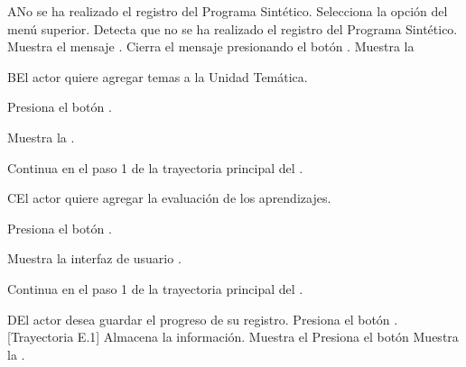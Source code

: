 
\begin{UCtrayectoriaA}{A}{No se ha realizado el registro del Programa Sintético.}
    \UCpaso[\UCactor] Selecciona la opción  del menú superior.
    \UCpaso Detecta que no se ha realizado el registro del Programa Sintético.
        \UCpaso Muestra el mensaje .
    \UCpaso[\UCactor] Cierra el mensaje presionando el botón .
    \UCpaso Muestra la 
\end{UCtrayectoriaA}


\begin{UCtrayectoriaA}{B}{El actor quiere agregar temas a la Unidad Temática.}

\UCpaso[\UCactor] Presiona el botón .

\UCpaso Muestra la .

\UCpaso Continua en el paso 1 de la trayectoria principal del .
\end{UCtrayectoriaA}


\begin{UCtrayectoriaA}{C}{El actor quiere agregar la evaluación de los aprendizajes.}

\UCpaso[\UCactor] Presiona el botón .

\UCpaso Muestra la interfaz de usuario .

\UCpaso Continua en el paso 1 de la trayectoria principal del .
\end{UCtrayectoriaA}


\begin{UCtrayectoriaA}{D}{El actor desea guardar el progreso de su registro.}
\UCpaso[\UCactor] Presiona el botón . [Trayectoria E.1]
\UCpaso Almacena la información.
\UCpaso Muestra el 
\UCpaso[\UCactor] Presiona el botón  
\UCpaso Muestra la .
\end{UCtrayectoriaA}

